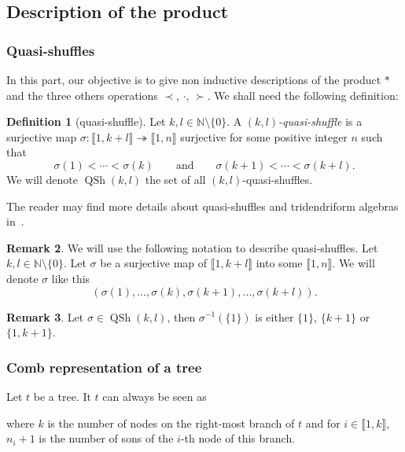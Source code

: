 \documentclass[10pt,a4paper]{amsart}
\numberwithin{equation}{section}
\theoremstyle{definition}
\newtheorem{defi}{Definition}[section]
\newtheorem{Rq}[defi]{Remark}
\theoremstyle{plain}
\newcommand{\IEM}[2]{\llbracket #1,#2 \rrbracket}
\newcommand{\N}{\mathbb{N}}
\DeclareMathOperator{\batc}{QSh}
\begin{document}
\subsection{Description of the product}
\subsubsection{Quasi-shuffles}
In this part, our objective is to give non inductive descriptions of the product $*$ and the three others operations $\prec$, $\cdot$, $\succ$. We shall need the following definition:
\begin{defi}[quasi-shuffle]
	Let $k,l\in\N\setminus \{0\}$. A \emph{$(k,l)$-quasi-shuffle} is a surjective map $\sigma\colon\IEM{1}{k+l}\twoheadrightarrow\IEM{1}{n}$ surjective for some positive integer $n$ such that
	\[
	\sigma(1)<\cdots<\sigma(k) \qquad \text{and} \qquad \sigma(k+1)<\cdots<\sigma(k+l).
	\]
	We will denote $\batc(k,l)$ the set of all $(k,l)$-quasi-shuffles.
\end{defi}

The reader may find more details about quasi-shuffles and tridendriform algebras in~\cite{Bruhat}.

\begin{Rq}
	We will use the following notation to describe quasi-shuffles. Let $k,l\in\N\setminus\{0\}$. Let $\sigma$ be a surjective map of $\IEM{1}{k+l}$ into some $\IEM{1}{n}$. We will denote $\sigma$ like this
	\[
	(\sigma(1),\dots,\sigma(k),\sigma(k+1),\dots,\sigma(k+l)).
	\]
\end{Rq}
\begin{Rq}
	Let $\sigma\in\batc(k,l)$, then $\sigma^{-1}(\{1\})$ is either $\{1\}$, $\{k+1\}$ or $\{1,k+1\}$.
\end{Rq}

\subsubsection{Comb representation of a tree}

Let $t$ be a tree. It $t$ can always be seen as
\begin{center}
\end{center}
where $k$ is the number of nodes on the right-most branch of $t$ and for $i\in\IEM{1}{k}$, $n_i+1$ is the number of sons of the $i$-th node of this branch.
\end{document}

